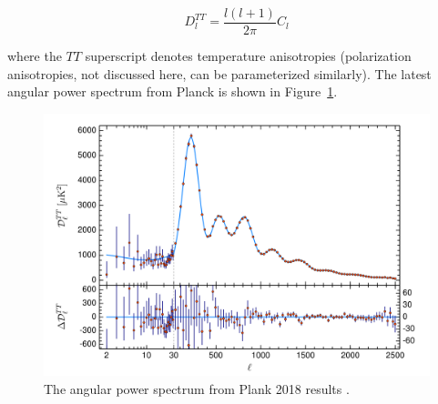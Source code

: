 \begin{equation}
D_{l}^{TT} = \frac{ l(l + 1)}{ 2 \pi} C_{l}
\end{equation}
 
where the $TT$ superscript denotes temperature anisotropies (polarization anisotropies, not discussed here, can be parameterized similarly). The latest angular power spectrum from Planck is shown in Figure~\ref{fig:planck_multipole}.

\begin{figure}[htbp]
\begin{center}
\includegraphics[width=\textwidth]{figures/theory/planck_multipole.png}
\caption{The angular power spectrum from Plank 2018 results  \cite{Planck2018}. }
\label{fig:planck_multipole}
\end{center}
\end{figure}

